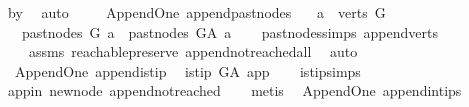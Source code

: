 \begin{isabellebody}
\ b{\isacharunderscore}{\kern0pt}y\ \isamarkupfalse%
\ auto\isanewline
\ \ \isamarkupfalse%
\isanewline
{}\isamarkupfalse%
%
\endisatagproof
{\isafoldproof}%
%
\isadelimproof
\isanewline
%
\endisadelimproof
\isanewline
{}\isamarkupfalse%
\ {\isacharparenleft}{\kern0pt}\ Append{\isacharunderscore}{\kern0pt}One{\isacharparenright}{\kern0pt}\ append{\isacharunderscore}{\kern0pt}past{\isacharunderscore}{\kern0pt}nodes{\isacharcolon}{\kern0pt}\isanewline
\ \ \ {\isachardoublequoteopen}a\ {\isasymin}\ verts\ G{\isachardoublequoteclose}\isanewline
\ \ \ {\isachardoublequoteopen}past{\isacharunderscore}{\kern0pt}nodes\ G\ a\ {\isacharequal}{\kern0pt}\ past{\isacharunderscore}{\kern0pt}nodes\ G{\isacharunderscore}{\kern0pt}A\ a{\isachardoublequoteclose}\isanewline
%
\isadelimproof
\ \ %
\endisadelimproof
%
\isatagproof
{}\isamarkupfalse%
\ past{\isacharunderscore}{\kern0pt}nodes{\isachardot}{\kern0pt}simps\ append{\isacharunderscore}{\kern0pt}verts\ \isamarkupfalse%
\ \isanewline
\ \ \ \ assms\ reachable{}{\isacharunderscore}{\kern0pt}preserve\ append{\isacharunderscore}{\kern0pt}not{\isacharunderscore}{\kern0pt}reached{\isacharunderscore}{\kern0pt}all\ \isamarkupfalse%
\ auto%
\endisatagproof
{\isafoldproof}%
%
\isadelimproof
\isanewline
%
\endisadelimproof
\isanewline
{}\isamarkupfalse%
\ {\isacharparenleft}{\kern0pt}\ Append{\isacharunderscore}{\kern0pt}One{\isacharparenright}{\kern0pt}\ append{\isacharunderscore}{\kern0pt}is{\isacharunderscore}{\kern0pt}tip{\isacharcolon}{\kern0pt}\isanewline
\ \ {\isachardoublequoteopen}is{\isacharunderscore}{\kern0pt}tip\ G{\isacharunderscore}{\kern0pt}A\ app{\isachardoublequoteclose}\isanewline
%
\isadelimproof
\ \ %
\endisadelimproof
%
\isatagproof
{}\isamarkupfalse%
\ is{\isacharunderscore}{\kern0pt}tip{\isachardot}{\kern0pt}simps\ \isanewline
\ \ \isamarkupfalse%
\ app{\isacharunderscore}{\kern0pt}in\ new{\isacharunderscore}{\kern0pt}node\ append{\isacharunderscore}{\kern0pt}not{\isacharunderscore}{\kern0pt}reached\isanewline
\ \ \isamarkupfalse%
\ metis%
\endisatagproof
{\isafoldproof}%
%
\isadelimproof
\isanewline
%
\endisadelimproof
\isanewline
{}\isamarkupfalse%
\ {\isacharparenleft}{\kern0pt}\ Append{\isacharunderscore}{\kern0pt}One{\isacharparenright}{\kern0pt}\ append{\isacharunderscore}{\kern0pt}in{\isacharunderscore}{\kern0pt}tips{\isacharcolon}{\kern0pt}\isanewline

\end{isabellebody}
